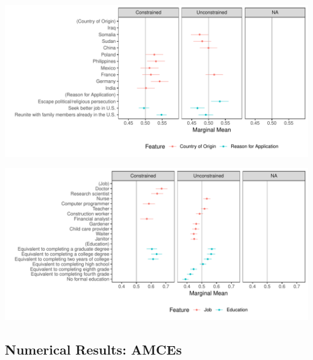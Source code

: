 \documentclass[a4paper,12pt]{article}\usepackage[]{graphicx}\usepackage[]{color}
\makeatletter
\def\maxwidth{ %
  \ifdim\Gin@nat@width>\linewidth
    \linewidth
  \else
    \Gin@nat@width
  \fi
}
\newenvironment{knitrout}{}{} %
\makeatother
\begin{document}
\clearpage

\begin{knitrout}
\color{fgcolor}
\includegraphics[width=\maxwidth]{figure/hainmueller_immigration_amce_appendix_split-1} 

\includegraphics[width=\maxwidth]{figure/hainmueller_immigration_amce_appendix_split-2} 

\end{knitrout}

\clearpage

\subsection{Numerical Results: AMCEs}
\end{document}
